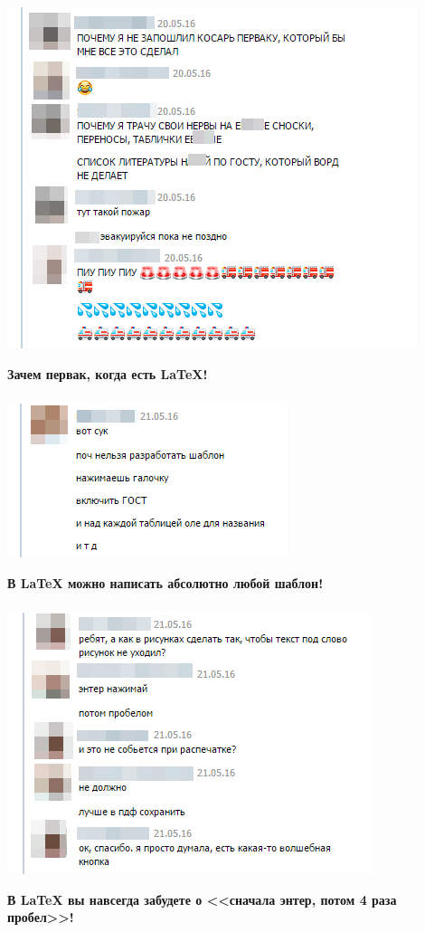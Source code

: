 \documentclass[newPxFont]{beamer}
\begin{document}
\begin{frame}
\frametitle{\insertsection} 
    \centering
    \includegraphics[height=0.7\textheight]{m4.png}
    
    \vfill
    \alert{\textbf{Зачем первак, когда есть \LaTeX{}!}}
\end{frame}


\begin{frame}
\frametitle{\insertsection} 
    \centering
    \includegraphics[scale=0.5]{m5.png}
    
    \vfill
    \alert{\textbf{В \LaTeX{} можно написать абсолютно любой шаблон!}}
\end{frame}


\begin{frame}
\frametitle{\insertsection} 
    \centering
    \includegraphics[height=0.6\textheight]{m6.png}
    
    \vfill
    \alert{\textbf{В \LaTeX{} вы навсегда забудете о <<сначала энтер, потом 4 раза пробел>>!}}
\end{frame}
\end{document}
